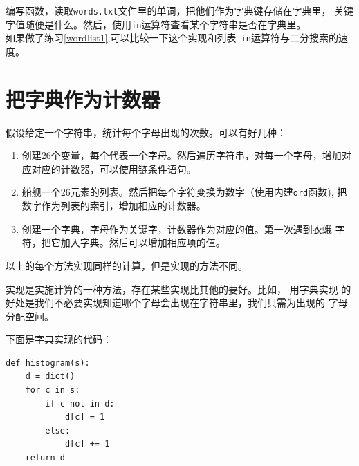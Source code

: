 
\begin{ex}
\label{wordlist2}


编写函数，读取{\tt words.txt}文件里的单词，把他们作为字典键存储在字典里，
关键字值随便是什么。然后，使用{\tt in}运算符查看某个字符串是否在字典里。\\


如果做了练习\ref{wordlist1},可以比较一下这个实现和列表{\tt
	in}运算符与二分搜索的速度。

\end{ex}

\section{把字典作为计数器}
\label{histogram}



假设给定一个字符串，统计每个字母出现的次数。可以有好几种：

\begin{enumerate}

\item
创建26个变量，每个代表一个字母。然后遍历字符串，对每一个字母，增加对应对应的计数器，可以使用链条件语句。

\item 船舰一个26元素的列表。然后把每个字符变换为数字（使用内建{\tt ord}函数),
把数字作为列表的索引，增加相应的计数器。

\item 创建一个字典，字母作为关键字，计数器作为对应的值。第一次遇到衣蛾
字符，把它加入字典。然后可以增加相应项的值。

\end{enumerate}


以上的每个方法实现同样的计算，但是实现的方法不同。


实现是实施计算的一种方法，存在某些实现比其他的要好。比如， 用字典实现
的好处是我们不必要实现知道哪个字母会出现在字符串里，我们只需为出现的
字母分配空间。

下面是字典实现的代码：

\beforeverb
\begin{verbatim}
def histogram(s):
    d = dict()
    for c in s:
        if c not in d:
            d[c] = 1
        else:
            d[c] += 1
    return d
\end{verbatim}
\afterverb

